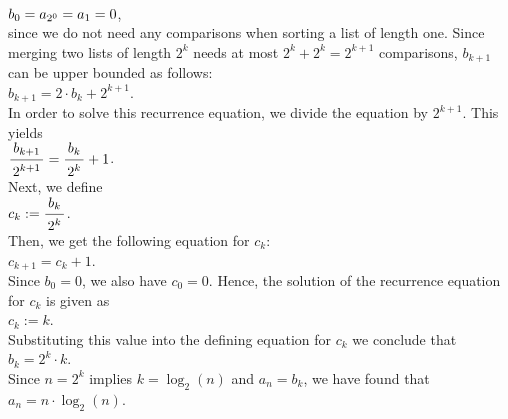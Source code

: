 \\[0.2cm]
\hspace*{1.3cm}
$\displaystyle b_0 = a_{2^0} = a_1 = 0$,
\\[0.2cm]
since we do not need any comparisons when sorting a list of length one.  Since merging two lists of
length $2^k$ needs at most  $2^k + 2^k = 2^{k+1}$ comparisons, $b_{k+1}$ can be upper bounded as follows:
\\[0.2cm]
\hspace*{1.3cm}
$b_{k+1} = 2 \cdot b_k + 2^{k+1}$. 
\\[0.2cm]
In order to solve this recurrence equation, we divide the equation by $2^{k+1}$.
This yields
\\[0.2cm]
\hspace*{1.3cm}
$\bruch{b_{k+1}}{2^{k+1}} = \bruch{b_k}{2^k} + 1$.
\\[0.2cm]
Next, we define
\\[0.2cm]
\hspace*{1.3cm}
$c_k := \bruch{b_k}{2^k}$.
\\[0.2cm]
Then, we get the following equation for $c_k$:
\\[0.2cm]
\hspace*{1.3cm}
$c_{k+1} = c_k + 1$.
\\[0.2cm]
Since $b_0 = 0$, we also have $c_0 = 0$.  Hence, the solution of the recurrence equation for $c_k$
is given as
\\[0.2cm]
\hspace*{1.3cm}
$c_k := k$.
\\[0.2cm]
Substituting this value into the defining equation for $c_k$ we conclude that
\\[0.2cm]
\hspace*{1.3cm}
$b_k = 2^k \cdot k$.
\\[0.2cm]
Since $n = 2^k$ implies $k = \log_2(n)$ and $a_n = b_k$, we have found that
\\[0.2cm]
\hspace*{1.3cm}
$a_n = n \cdot \log_2(n)$. 


